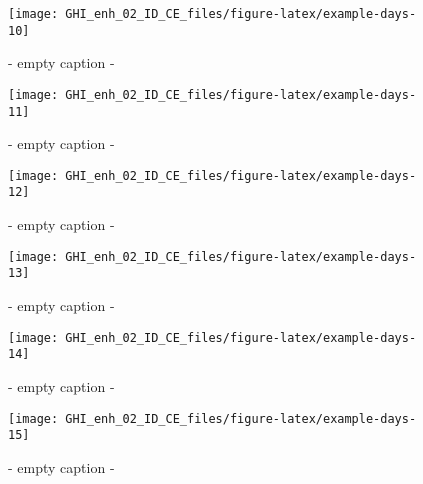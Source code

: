 \documentclass[
  10pt,
  a4paper,oneside]{article}
\begin{document}
\begin{figure}[H]

{\centering \texttt{[image: GHI\_enh\_02\_ID\_CE\_files/figure-latex/example-days-10]} 

}

\caption{ - empty caption - }\label{fig:example-days-10}
\end{figure}

\begin{figure}[H]

{\centering \texttt{[image: GHI\_enh\_02\_ID\_CE\_files/figure-latex/example-days-11]} 

}

\caption{ - empty caption - }\label{fig:example-days-11}
\end{figure}

\begin{figure}[H]

{\centering \texttt{[image: GHI\_enh\_02\_ID\_CE\_files/figure-latex/example-days-12]} 

}

\caption{ - empty caption - }\label{fig:example-days-12}
\end{figure}

\begin{figure}[H]

{\centering \texttt{[image: GHI\_enh\_02\_ID\_CE\_files/figure-latex/example-days-13]} 

}

\caption{ - empty caption - }\label{fig:example-days-13}
\end{figure}

\begin{figure}[H]

{\centering \texttt{[image: GHI\_enh\_02\_ID\_CE\_files/figure-latex/example-days-14]} 

}

\caption{ - empty caption - }\label{fig:example-days-14}
\end{figure}

\begin{figure}[H]

{\centering \texttt{[image: GHI\_enh\_02\_ID\_CE\_files/figure-latex/example-days-15]} 

}

\caption{ - empty caption - }\label{fig:example-days-15}
\end{figure}
\end{document}
